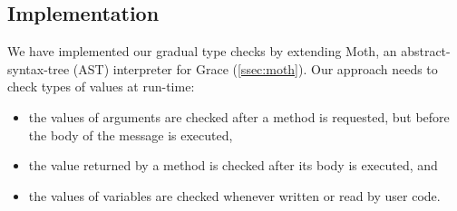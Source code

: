 

\subsection{Implementation} 
\label{ssec:implementation} 


We have implemented our gradual type checks 
by extending Moth, 
an abstract-syntax-tree (AST) interpreter for
Grace (\cref{ssec:moth}).
%
%
%
%
Our approach needs to check types of values at run-time:

\begin{itemize}
\item the values of arguments are checked after a method is requested, 
      but before the body of the message is executed,
\item the value returned by a method is checked after its body is executed, and
\item the values of variables are checked
      whenever written or read by user code.
\end{itemize}

